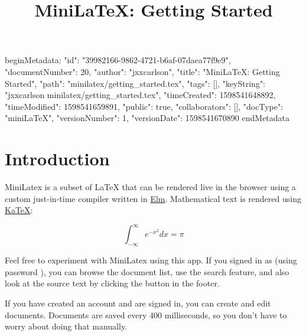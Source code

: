 beginMetadata:
{
    "id": "39982166-9862-4721-b6af-07daea77f9e9",
    "documentNumber": 20,
    "author": "jxxcarlson",
    "title": "MiniLaTeX: Getting Started",
    "path": "minilatex/getting_started.tex",
    "tags": [],
    "keyString": "jxxcarlson minilatex/getting_started.tex",
    "timeCreated": 1598541648892,
    "timeModified": 1598541659891,
    "public": true,
    "collaborators": [],
    "docType": "miniLaTeX",
    "versionNumber": 1,
    "versionDate": 1598541670890
}
endMetadata
\title{MiniLaTeX: Getting Started}


\begin{mathmacro}
\newcommand{\bt}[1]{\bf{#1}}
\newcommand{\mca}[0]{\mathcal{A}}
\end{mathmacro}

\begin{textmacro}
\newcommand{\boss}{Phineas Fogg}
\newcommand{\hello}[1]{Hello \strong{#1}!}
\newcommand{\reverseconcat}[3]{#3#2#1}
\end{textmacro}

\maketitle


\tableofcontents

\section{Introduction}



MiniLatex is a subset of LaTeX that can be
rendered live in the browser using a custom just-in-time compiler written in \href{https://elm-lang.org}{Elm}.
Mathematical text is rendered using \href{https://katex.org}{KaTeX}:

$$
\int_{-\infty}^\infty e^{-x^2} dx = \pi
$$



 Feel free to
experiment with MiniLatex using this app.  If you signed in as
 (using password ), you can browse
the document list, use the search feature, and also look at
the source text by clicking the  button in the footer.


 If you have created an account and  are signed in, you can create and edit documents.  Documents are saved every 400 milliseconds, so you don't have to worry about doing that manually.

